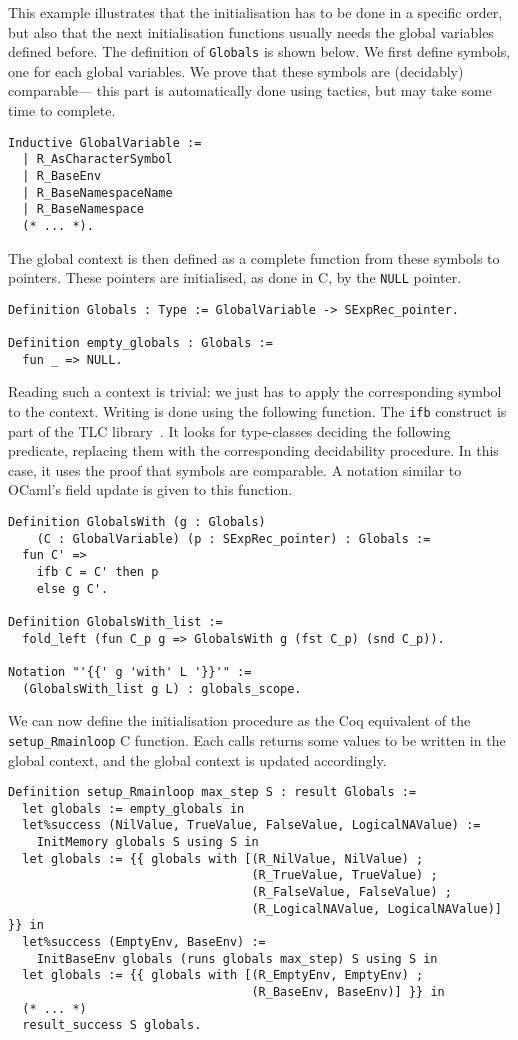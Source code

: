 \documentclass{article}
\newcommand\Coq{Coq}
\newcommand\OCaml{OCaml}
\newcommand\Cn{C}
\begin{document}
This example illustrates that the initialisation has to be done
in a specific order, but also that the next initialisation functions
usually needs the global variables defined before.
The definition of \texttt{Globals} is shown below.
We first define symbols,
one for each global variables.
We prove that these symbols are (decidably) comparable—%
this part is automatically done using tactics,
but may take some time to complete.
\begin{verbatim}
Inductive GlobalVariable :=
  | R_AsCharacterSymbol
  | R_BaseEnv
  | R_BaseNamespaceName
  | R_BaseNamespace
  (* ... *).
\end{verbatim}
The global context is then defined as a complete function
from these symbols to pointers.
These pointers are initialised,
as done in \Cn{},
by the \texttt{NULL} pointer.
\begin{verbatim}
Definition Globals : Type := GlobalVariable -> SExpRec_pointer.

Definition empty_globals : Globals :=
  fun _ => NULL.
\end{verbatim}
Reading such a context is trivial:
we just has to apply the corresponding symbol to the context.
Writing is done using the following function.
The \texttt{ifb} construct is part of the TLC library~\parencite{TLC}.
It looks for type-classes deciding the following predicate,
replacing them with the corresponding decidability procedure.
In this case, it uses the proof that symbols are comparable.
A notation similar to \OCaml{}’s field update is given to this function.
\begin{verbatim}
Definition GlobalsWith (g : Globals)
    (C : GlobalVariable) (p : SExpRec_pointer) : Globals :=
  fun C' =>
    ifb C = C' then p
    else g C'.

Definition GlobalsWith_list :=
  fold_left (fun C_p g => GlobalsWith g (fst C_p) (snd C_p)).

Notation "'{{' g 'with' L '}}'" :=
  (GlobalsWith_list g L) : globals_scope.
\end{verbatim}
We can now define the initialisation procedure
as the \Coq{} equivalent of the \texttt{setup_Rmainloop}
\Cn{} function.
Each calls returns some values to be written in the global context,
and the global context is updated accordingly.
\begin{verbatim}
Definition setup_Rmainloop max_step S : result Globals :=
  let globals := empty_globals in
  let%success (NilValue, TrueValue, FalseValue, LogicalNAValue) :=
    InitMemory globals S using S in
  let globals := {{ globals with [(R_NilValue, NilValue) ;
                                  (R_TrueValue, TrueValue) ;
                                  (R_FalseValue, FalseValue) ;
                                  (R_LogicalNAValue, LogicalNAValue)] }} in
  let%success (EmptyEnv, BaseEnv) :=
    InitBaseEnv globals (runs globals max_step) S using S in
  let globals := {{ globals with [(R_EmptyEnv, EmptyEnv) ;
                                  (R_BaseEnv, BaseEnv)] }} in
  (* ... *)
  result_success S globals.
\end{verbatim}
\end{document}
